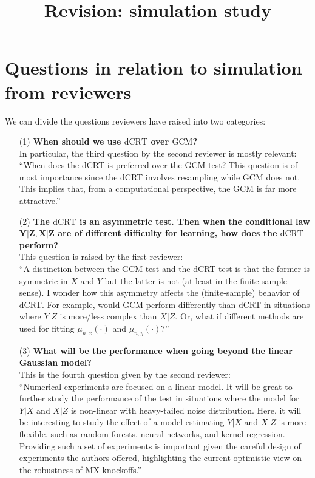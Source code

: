 \documentclass{article}
\title{Revision: simulation study}
\begin{document}
\maketitle

\begin{abstract}
  
\end{abstract}




\section{Questions in relation to simulation from reviewers}

We can divide the questions reviewers have raised into two categories:
\begin{enumerate}
	\item[(1)]\textbf{When should we use $\mathrm{dCRT}$ over $\mathrm{GCM}$?}\\ 
	In particular, the third question by the second reviewer is mostly relevant:\\
	``When does the dCRT is preferred over the GCM test? This question is of most importance 
	since the dCRT involves resampling while GCM does not. This implies that, from a 
	computational perspective, the GCM is far more attractive.''
	\item[(2)] \textbf{The $\mathrm{dCRT}$ is an asymmetric test. Then when the conditional law $\bm Y|\bm Z,\bm X|\bm Z$ are of different difficulty for learning, how does the $\mathrm{dCRT}$ perform?}\\
	This question is raised by the first reviewer:\\
	``A distinction between the GCM test and the dCRT test is that the former is
	symmetric in $X$ and $Y$ but the latter is not (at least in the finite-sample sense).
	I wonder how this asymmetry affects the (finite-sample) behavior of dCRT. For
	example, would GCM perform differently than dCRT in situations where $Y|Z$
	is more/less complex than $X|Z$. Or, what if different methods are used for
	fitting $\mu_{n,x}(\cdot)$ and $\mu_{n,y}(\cdot)$?''
	\item[(3)] \textbf{What will be the performance when going beyond the linear Gaussian model?}\\
	This is the fourth question given by the second reviewer:\\
	``Numerical experiments are focused on a linear model. It will be great to further study the 
	performance of the test in situations where the model for $Y|X$ and $X|Z$ is non-linear with 
	heavy-tailed noise distribution. Here, it will be interesting to study the effect of a model 
	estimating $Y|X$ and $X|Z$ is more flexible, such as random forests, neural networks, and 
	kernel regression. Providing such a set of experiments is important given the careful design 
	of  experiments  the  authors  offered,  highlighting  the  current  optimistic  view  on  the 
	robustness of MX knockoffs.''
\end{enumerate}
\end{document}
